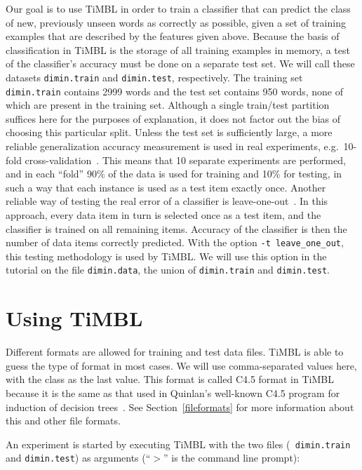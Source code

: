 \documentclass{report}
\begin{document}
Our goal is to use TiMBL in order to train a classifier that can
predict the class of new, previously unseen words as correctly as
possible, given a set of training examples that are described by the
features given above. Because the basis of classification in TiMBL is
the storage of all training examples in memory, a test of the
classifier's accuracy must be done on a separate test set. We will
call these datasets {\tt dimin.train} and {\tt dimin.test},
respectively. The training set {\tt dimin.train} contains 2999 words
and the test set contains 950 words, none of which are present in the
training set. Although a single train/test partition suffices here for
the purposes of explanation, it does not factor out the bias of
choosing this particular split. Unless the test set is sufficiently
large, a more reliable generalization accuracy measurement is used in
real experiments, e.g.~10-fold cross-validation~\cite{Weiss+91}. This
means that 10 separate experiments are performed, and in each ``fold''
90\% of the data is used for training and 10\% for testing, in such a
way that each instance is used as a test item exactly once. Another
reliable way of testing the real error of a classifier is
leave-one-out~\cite{Weiss+91}. In this approach, every data item in
turn is selected once as a test item, and the classifier is trained on
all remaining items. Accuracy of the classifier is then the number of
data items correctly predicted. With the option {\tt -t
leave\_one\_out}, this testing methodology is used by TiMBL. We
will use this option in the tutorial on the file {\tt dimin.data}, the
union of {\tt dimin.train} and {\tt dimin.test}. 

\section{Using TiMBL}

Different formats are allowed for training and test data files. TiMBL
is able to guess the type of format in most cases. We will use
comma-separated values here, with the class as the last value. This
format is called C4.5 format in TiMBL because it is the same as that
used in Quinlan's well-known C4.5 program for induction of decision
trees~\cite{Quinlan93}. See Section~\ref{fileformats} for more
information about this and other file formats.

An experiment is started by executing TiMBL with the two files ({\tt
  dimin.train} and {\tt dimin.test}) as arguments (``$>$'' is the
command line prompt):
\end{document}
